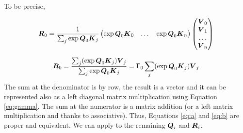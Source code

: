 \documentclass[conference]{IEEEtran}
\begin{document}
To be precise, 

\begin{equation}
  \label{eq:a}
  \Vc{R}_0 = \frac{1}{\sum_j\exp{\Vc{Q}_0\Vc{K}_j}}
  \begin{pmatrix}
    \exp{\Vc{Q}_0\Vc{K}_0} &  \dots &\exp{\Vc{Q}_0\Vc{K}_n} 
  \end{pmatrix}
  \begin{pmatrix}
    \Vc{V}_0  \\
    \Vc{V}_1  \\
    \dots \\
    \Vc{V}_n
  \end{pmatrix} 
\end{equation}

\begin{equation}
  \label{eq:b}
  \Vc{R}_0 = \frac{\sum_j(\exp{\Vc{Q}_0\Vc{K}_j})\Vc{V}_j}{\sum_j\exp{\Vc{Q}_0\Vc{K}_j}}=\Gamma_0\sum_j(\exp{\Vc{Q}_0\Vc{K}_j})\Vc{V}_j
\end{equation}
The sum at the denominator is by row, the result is a vector and it
can be represented also as a left diagonal matrix multiplication using
Equation \ref{eq:gamma}.  The sum at the numerator is a matrix
addition (or a left matrix multiplication and thanks to
associative). Thus, Equations \ref{eq:a} and \ref{eq:b} are proper and
equivalent. We can apply to the remaining ${\boldsymbol Q}_i$ and ${\boldsymbol R}_i$.
\end{document}
